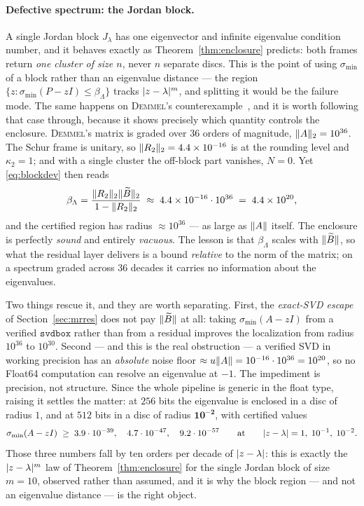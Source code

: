 \documentclass[11pt]{article}
\newcommand{\sigmin}{\sigma_{\min}}
\DeclarePairedDelimiter{\norm}{\lVert}{\rVert}
\DeclarePairedDelimiter{\abs}{\lvert}{\rvert}
\newcommand{\svdbox}{\texttt{svdbox}}
\begin{document}
\paragraph{Defective spectrum: the Jordan block.} A single Jordan block $J_\lambda$ has one
eigenvector and infinite eigenvalue condition number, and it behaves exactly as
Theorem~\ref{thm:enclosure} predicts: both frames return \emph{one cluster of size $n$}, never $n$
separate discs. This is the point of using $\sigmin$ of a block rather than an eigenvalue distance ---
the region $\{z:\sigmin(P-zI)\le\beta_\Lambda\}$ tracks $\abs{z-\lambda}^m$, and splitting it would be
the failure mode. The same happens on \textsc{Demmel}'s counterexample~\cite{Demmel1987}, and it is
worth following that case through, because it shows precisely which quantity controls the enclosure.
\textsc{Demmel}'s matrix is graded over $36$ orders of magnitude, $\norm{A}_2=10^{36}$. The Schur
frame is unitary, so $\norm{R_2}_2=4.4\times10^{-16}$ is at the rounding level and $\kappa_2=1$; and
with a single cluster the off-block part vanishes, $N=0$. Yet \eqref{eq:blockdev} then reads
\[
  \beta_\Lambda=\frac{\norm{R_2}_2\norm{\widetilde B}_2}{1-\norm{R_2}_2}
  \;\approx\;4.4\times10^{-16}\cdot10^{36}\;=\;4.4\times10^{20},
\]
and the certified region has radius $\approx10^{36}$ --- as large as $\norm{A}$ itself. The enclosure
is perfectly \emph{sound} and entirely \emph{vacuous}. The lesson is that $\beta_\Lambda$ scales with
$\norm{\widetilde B}$, so what the residual layer delivers is a bound \emph{relative} to the norm of
the matrix; on a spectrum graded across $36$ decades it carries no information about the eigenvalues.

Two things rescue it, and they are worth separating. First, the \emph{exact-SVD escape} of
Section~\ref{sec:mrres} does not pay $\norm{\widetilde B}$ at all: taking
$\sigmin(A-zI)$ from a verified $\svdbox$ rather than from a residual improves the localization from
radius $10^{36}$ to $10^{30}$. Second --- and this is the real obstruction --- a verified SVD in
working precision has an \emph{absolute} noise floor $\approx u\norm{A}=10^{-16}\cdot10^{36}=10^{20}$,
so no Float64 computation can resolve an eigenvalue at $-1$. The impediment is precision, not
structure. Since the whole pipeline is generic in the float type, raising it settles the matter: at
$256$ bits the eigenvalue is enclosed in a disc of radius $1$, and at $512$ bits in a disc of radius
$\boldsymbol{10^{-2}}$, with certified values
\[
  \sigmin(A-zI)\;\ge\;3.9\cdot10^{-39},\quad 4.7\cdot10^{-47},\quad 9.2\cdot10^{-57}
  \qquad\text{at}\qquad \abs{z-\lambda}=1,\;10^{-1},\;10^{-2}.
\]
Those three numbers fall by ten orders per decade of $\abs{z-\lambda}$: this is exactly the
$\abs{z-\lambda}^{m}$ law of Theorem~\ref{thm:enclosure} for the single Jordan block of size $m=10$,
observed rather than assumed, and it is why the block region --- and not an eigenvalue distance --- is
the right object.
\end{document}

